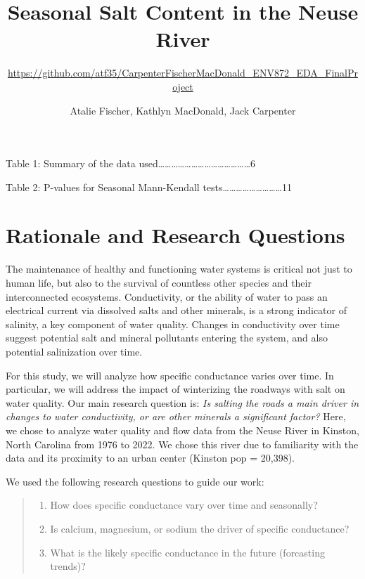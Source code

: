 \documentclass[
  12pt,
]{article}
\title{Seasonal Salt Content in the Neuse River}
\subtitle{\url{https://github.com/atf35/CarpenterFischerMacDonald_ENV872_EDA_FinalProject}}
\author{Atalie Fischer, Kathlyn MacDonald, Jack Carpenter}
\date{}
\providecommand{\tightlist}{%
  \setlength{\itemsep}{0pt}\setlength{\parskip}{0pt}}
\begin{document}
\maketitle

{
\setcounter{tocdepth}{2}
\tableofcontents
}
\newpage

\listoftables

Table 1: Summary of the data
used\ldots\ldots\ldots\ldots\ldots\ldots\ldots\ldots\ldots\ldots\ldots\ldots\ldots\ldots6

Table 2: P-values for Seasonal Mann-Kendall
tests\ldots\ldots\ldots\ldots\ldots\ldots\ldots\ldots\ldots11 \newpage

\listoffigures 
\newpage

\hypertarget{rationale-and-research-questions}{%
\section{Rationale and Research
Questions}\label{rationale-and-research-questions}}

The maintenance of healthy and functioning water systems is critical not
just to human life, but also to the survival of countless other species
and their interconnected ecosystems. Conductivity, or the ability of
water to pass an electrical current via dissolved salts and other
minerals, is a strong indicator of salinity, a key component of water
quality. Changes in conductivity over time suggest potential salt and
mineral pollutants entering the system, and also potential salinization
over time.

For this study, we will analyze how specific conductance varies over
time. In particular, we will address the impact of winterizing the
roadways with salt on water quality. Our main research question is:
\emph{Is salting the roads a main driver in changes to water
conductivity, or are other minerals a significant factor?} Here, we
chose to analyze water quality and flow data from the Neuse River in
Kinston, North Carolina from 1976 to 2022. We chose this river due to
familiarity with the data and its proximity to an urban center (Kinston
pop = 20,398).

We used the following research questions to guide our work:

\begin{quote}
\begin{enumerate}
\def\labelenumi{\arabic{enumi}.}
\tightlist
\item
  How does specific conductance vary over time and seasonally?
\item
  Is calcium, magnesium, or sodium the driver of specific conductance?
\item
  What is the likely specific conductance in the future (forcasting
  trends)?
\end{enumerate}
\end{quote}
\end{document}
